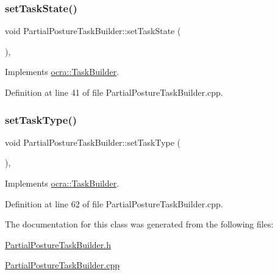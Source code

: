 \subsubsection{\texorpdfstring{set\+Task\+State()}{setTaskState()}}
{\footnotesize\ttfamily void Partial\+Posture\+Task\+Builder\+::set\+Task\+State (\begin{DoxyParamCaption}{ }\end{DoxyParamCaption})\hspace{0.3cm}{\ttfamily [protected]}, {\ttfamily [virtual]}}



Implements \hyperlink{classocra_1_1TaskBuilder_a7b44bfa101566ea4400e2d9bfdb9ff32}{ocra\+::\+Task\+Builder}.



Definition at line 41 of file Partial\+Posture\+Task\+Builder.\+cpp.

\hypertarget{classocra_1_1PartialPostureTaskBuilder_acf2b5f880dc19e43356552b348d8a010}{}\label{classocra_1_1PartialPostureTaskBuilder_acf2b5f880dc19e43356552b348d8a010} 
\subsubsection{\texorpdfstring{set\+Task\+Type()}{setTaskType()}}
{\footnotesize\ttfamily void Partial\+Posture\+Task\+Builder\+::set\+Task\+Type (\begin{DoxyParamCaption}{ }\end{DoxyParamCaption})\hspace{0.3cm}{\ttfamily [protected]}, {\ttfamily [virtual]}}



Implements \hyperlink{classocra_1_1TaskBuilder_a1a979fc495be6dc30483aa8fd0ff2650}{ocra\+::\+Task\+Builder}.



Definition at line 62 of file Partial\+Posture\+Task\+Builder.\+cpp.



The documentation for this class was generated from the following files\+:\begin{DoxyCompactItemize}
\item 
\hyperlink{PartialPostureTaskBuilder_8h}{Partial\+Posture\+Task\+Builder.\+h}\item 
\hyperlink{PartialPostureTaskBuilder_8cpp}{Partial\+Posture\+Task\+Builder.\+cpp}\end{DoxyCompactItemize}
